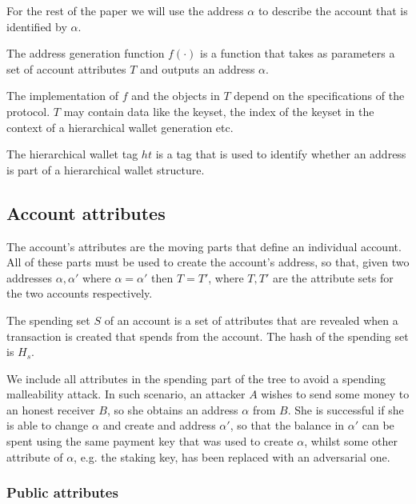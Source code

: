For the rest of the paper we will use the address $\alpha$ to describe the account that is identified by $\alpha$.

\begin{defn}\label{def:addressgen}
The address generation function $f(\cdot)$ is a function that takes as parameters a set of account attributes $T$ and outputs an address $\alpha$.
\end{defn}

The implementation of $f$ and the objects in $T$ depend on the specifications of the protocol. $T$ may contain data like the keyset, the index of the keyset in the context of a hierarchical wallet generation etc.


\begin{defn}\label{def:hierarchical_tag}
The hierarchical wallet tag $ht$ is a tag that is used to identify whether an address is part of a hierarchical wallet structure.
\end{defn}

\subsection{Account attributes}

The account's attributes are the moving parts that define an individual account. All of these parts must be used to create the account's address, so that, given two addresses $\alpha, \alpha'$ where $\alpha = \alpha'$ then $T = T'$, where $T, T'$ are the attribute sets for the two accounts respectively.

\begin{defn}\label{def:spending_part}
The spending set $S$ of an account is a set of attributes that are revealed when a transaction is created that spends from the account. The hash of the spending set is $H_s$.
\end{defn}

We include all attributes in the spending part of the tree to avoid a spending malleability attack. In such scenario, an attacker $A$ wishes to send some money to an honest receiver $B$, so she obtains an address $\alpha$ from $B$. She is successful if she is able to change $\alpha$ and create and address $\alpha'$, so that the balance in $\alpha'$ can be spent using the same payment key that was used to create $\alpha$, whilst some other attribute of $\alpha$, e.g. the staking key, has been replaced with an adversarial one.

\subsubsection{Public attributes}

